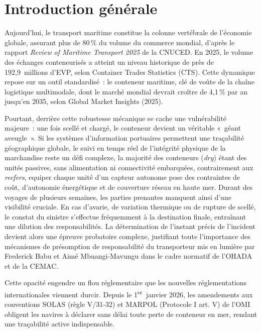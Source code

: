 \chapter*{Introduction générale}

Aujourd’hui, le transport maritime constitue la colonne vertébrale de l’économie globale, assurant plus de 80\,\% du volume du commerce mondial, d'après le rapport \textit{Review of Maritime Transport 2025} de la CNUCED\cite{unctad2025}. En 2025, le volume des échanges conteneurisés a atteint un niveau historique de près de 192,9~millions d’EVP, selon Container Trades Statistics (CTS)\cite{cts2025}. Cette dynamique repose sur un outil standardisé~: le conteneur maritime, clé de voûte de la chaîne logistique multimodale, dont le marché mondial devrait croître de 4,1\,\% par an jusqu’en 2035, selon Global Market Insights (2025)\cite{gmi2025}.

Pourtant, derrière cette robustesse mécanique se cache une vulnérabilité majeure~: une fois scellé et chargé, le conteneur devient un véritable «~géant aveugle~». Si les systèmes d’information portuaires permettent une traçabilité géographique globale, le suivi en temps réel de l’intégrité physique de la marchandise reste un défi complexe, la majorité des conteneurs (\textit{dry}) étant des unités passives, sans alimentation ni connectivité embarquées, contrairement aux \textit{reefers}, equiper chaque unité d’un capteur autonome pose des contraintes de coût, d’autonomie énergétique et de couverture réseau en haute mer. Durant des voyages de plusieurs semaines, les parties prenantes manquent ainsi d’une visibilité cruciale. En cas d’avarie, de variation thermique ou de rupture de scellé, le constat du sinistre s'effectue fréquemment à la destination finale, entraînant une dilution des responsabilités. La détermination de l'instant précis de l'incident devient alors une épreuve probatoire complexe, justifiant toute l'importance des mécanismes de présomption de responsabilité du transporteur mis en lumière par Frederick Babu et Aimé Mbuangi-Mavungu dans le cadre normatif de l'OHADA et de la CEMAC\cite{babu_mbuangi2023}.

Cette opacité engendre un flou réglementaire que les nouvelles réglementations internationales viennent durcir. Depuis le 1\textsuperscript{er}~janvier 2026, les amendements aux conventions SOLAS (règle V/31-32) et MARPOL (Protocole I art. V) de l’OMI\cite{omi2026} obligent les navires à déclarer sans délai toute perte de conteneur en mer, rendant une traçabilité active indispensable.

